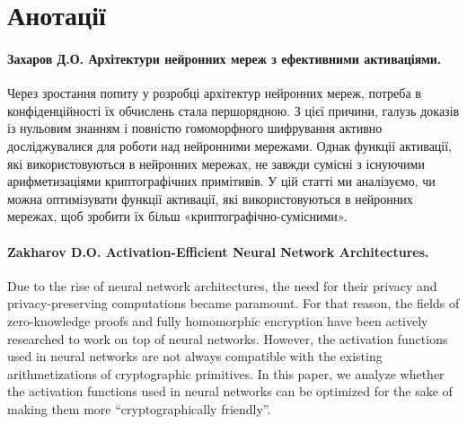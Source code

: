 \chapter*{Анотації}

\subsubsection{Захаров Д.О. Архітектури нейронних мереж з ефективними активаціями.}

Через зростання попиту у розробці архітектур нейронних мереж, потреба в
конфіденційності їх обчислень стала першорядною. З цієї причини, галузь
доказів із нульовим знанням і повністю гомоморфного шифрування активно
досліджувалися для роботи над нейронними мережами. Однак функції активації, які
використовуються в нейронних мережах, не завжди сумісні з існуючими
арифметизаціями криптографічних примітивів. У цій статті ми аналізуємо, чи можна
оптимізувати функції активації, які використовуються в нейронних мережах, щоб
зробити їх більш «криптографічно-сумісними».

\subsubsection{Zakharov D.O. Activation-Efficient Neural Network Architectures.}

Due to the rise of neural network architectures, the need for their privacy and
privacy-preserving computations became paramount. For that reason, the
fields of zero-knowledge proofs and fully homomorphic encryption have been
actively researched to work on top of neural networks. However, the
activation functions used in neural networks are not always compatible with
the existing arithmetizations of cryptographic primitives. In this paper, we
analyze whether the activation functions used in neural networks can be
optimized for the sake of making them more ``cryptographically friendly''.
